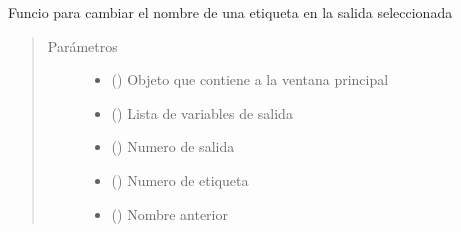 \documentclass[letterpaper,10pt,spanish]{sphinxmanual}
\begin{document}
\begin{fulllineitems}

\begin{fulllineitems}
\label{\detokenize{codigos/rutinas_fuzzy:rutinas_fuzzy.FuzzyController.cambio_etinombre_output}}
Funcio para cambiar el nombre de una etiqueta en la salida seleccionada
\begin{quote}\begin{description}
\item[{Parámetros}] \leavevmode\begin{itemize}
\item {} 
 () \textendash{} Objeto que contiene a la ventana principal

\item {} 
 () \textendash{} Lista de variables de salida

\item {} 
 () \textendash{} Numero de salida

\item {} 
 () \textendash{} Numero de etiqueta

\item {} 
 () \textendash{} Nombre anterior

\end{itemize}

\end{description}\end{quote}

\end{fulllineitems}



\end{fulllineitems}
\end{document}
